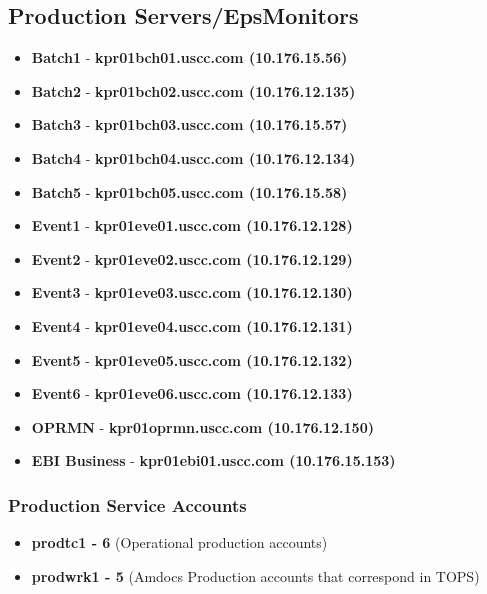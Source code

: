 \documentclass[12pt,twoside]{article}
\begin{document}
\subsection{Production Servers/EpsMonitors}
\label{sec:orgheadline12}
\footnotesize
\begin{itemize}
\item \textbf{Batch1} - \textbf{kpr01bch01.uscc.com (10.176.15.56)}
\item \textbf{Batch2} - \textbf{kpr01bch02.uscc.com (10.176.12.135)}
\item \textbf{Batch3} - \textbf{kpr01bch03.uscc.com (10.176.15.57)}
\item \textbf{Batch4} - \textbf{kpr01bch04.uscc.com (10.176.12.134)}
\item \textbf{Batch5} - \textbf{kpr01bch05.uscc.com (10.176.15.58)}
\item \textbf{Event1} - \textbf{kpr01eve01.uscc.com (10.176.12.128)}
\item \textbf{Event2} - \textbf{kpr01eve02.uscc.com (10.176.12.129)}
\item \textbf{Event3} - \textbf{kpr01eve03.uscc.com (10.176.12.130)}
\item \textbf{Event4} - \textbf{kpr01eve04.uscc.com (10.176.12.131)}
\item \textbf{Event5} - \textbf{kpr01eve05.uscc.com (10.176.12.132)}
\item \textbf{Event6} - \textbf{kpr01eve06.uscc.com (10.176.12.133)}
\item \textbf{OPRMN}  - \textbf{kpr01oprmn.uscc.com (10.176.12.150)}
\item \textbf{EBI Business} - \textbf{kpr01ebi01.uscc.com (10.176.15.153)}
\end{itemize}

\normalsize
\subsubsection{Production Service Accounts}
\label{sec:orgheadline9}
\begin{itemize}
\item \textbf{prodtc1 - 6} (Operational production accounts)
\item \textbf{prodwrk1 - 5} (Amdocs Production accounts that correspond in TOPS)
\end{itemize}
\end{document}
